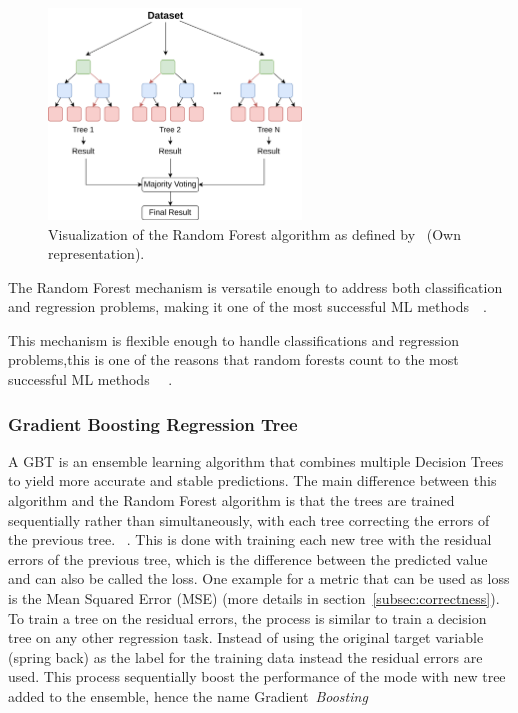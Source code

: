 \begin{figure}[h]
    \begin{tcolorbox}[arc=0pt,boxrule=0.5pt]
        \centering
        \includegraphics[width=0.6\textwidth]{chap4/images/random_forest_example}
    \end{tcolorbox}
    \caption{Visualization of the Random Forest algorithm as defined by~\cite[p.1]{breiman2001random} (Own
    representation).
    }
    \label{fig:rf-example}
\end{figure}

The Random Forest mechanism is versatile enough to address both classification and regression problems, making it one
of the most successful
\ac{ML} methods~\cite[p. 3--4]{biau2016random}~\cite[p. 25]{breiman2001random}.

This mechanism is flexible enough to handle classifications and regression problems,this is one of the reasons that
random forests count to the most successful \ac{ML}
methods
~\cite[p. 3--4]{biau2016random}~\cite[p. 25]{breiman2001random}.

\subsubsection{Gradient Boosting Regression Tree}

A \ac{GBT} is an ensemble learning algorithm that combines multiple Decision Trees
to yield more accurate and stable predictions.
The main difference between this algorithm and the Random Forest algorithm is that the trees are trained sequentially
rather than simultaneously, with each tree correcting the errors of the previous tree.
~\cite[p. 88--89]{muller2016introduction}.
This is done with training each new tree with the residual errors of the previous tree, which is the
difference between the predicted value and can also be called the loss.
One example for a metric that can be used as loss is the Mean Squared Error (MSE) (more details in
section~\ref{subsec:correctness}).
To train a tree on the residual errors, the process is similar to train a decision tree on any other regression
task.
Instead of using the original target variable (spring back) as the label for the training data instead the
residual errors are used.
This process sequentially boost the performance of the mode with new tree added to the
ensemble, hence the name Gradient~\textit{Boosting}
~\cite[p. 222]{boehmke2019hands}

